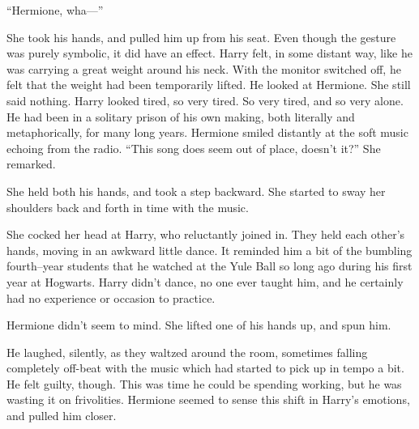 “Hermione, wha\mbox{---}”

She took his hands, and pulled him up from his seat. Even though the gesture was purely symbolic, it did have an effect. Harry felt, in some distant way, like he was carrying a great weight around his neck. With the monitor switched off, he felt that the weight had been temporarily lifted. He looked at Hermione.
\SmallVSpace
She still said nothing. Harry looked tired, so very tired. So very tired, and so very alone. He had been in a solitary prison of his own making, both literally and metaphorically, for many long years. Hermione smiled distantly at the soft music echoing from the radio.
\SmallVSpace
“This song does seem out of place, doesn’t it?” She remarked.


She held both his hands, and took a step backward. She started to sway her shoulders back and forth in time with the music.


She cocked her head at Harry, who reluctantly joined in. They held each other’s hands, moving in an awkward little dance. It reminded him a bit of the bumbling fourth\mbox{--}year students that he watched at the Yule Ball so long ago during his first year at Hogwarts. Harry didn’t dance, no one ever taught him, and he certainly had no experience or occasion to practice.

Hermione didn’t seem to mind. She lifted one of his hands up, and spun him.


He laughed, silently, as they waltzed around the room, sometimes falling completely off-beat with the music which had started to pick up in tempo a bit. He felt guilty, though. This was time he could be spending working, but he was wasting it on frivolities. Hermione seemed to sense this shift in Harry’s emotions, and pulled him closer.



